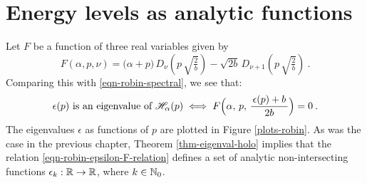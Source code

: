 \section{Energy levels as analytic functions} \label{section-robin-implicit-function}
Let $F$ be a function of three real variables given by
\begin{equation}
    F(\alpha, p, \nu) =
    \big( \alpha + p\big) \,
    D_\nu(p \, \sqrt{\tfrac{2}{b}})
    - \sqrt{2b} \,
    D_{\nu+1}(p \, \sqrt{\tfrac{2}{b}})
    \: .
\end{equation}
Comparing this with \eqref{eqn-robin-spectral}, we see that:
\begin{equation}
    \epsilon(p) \text{ is an eigenvalue of } \mathscr{H}_\alpha(p)
    \; \Longleftrightarrow \;
    F\Big(
        \alpha, \,
        p, \,
        \frac{\, \epsilon(p) + b \,}{2b}
    \Big) = 0 \: .
    \label{eqn-robin-epsilon-F-relation}
\end{equation}
The eigenvalues $\epsilon$ as functions of $p$ are plotted in Figure \ref{plots-robin}. As was the case in the previous chapter, Theorem \ref{thm-eigenval-holo} implies that the relation \eqref{eqn-robin-epsilon-F-relation} defines a set of analytic non-intersecting functions $\epsilon_k: \mathbb{R} \to \mathbb{R}$, where $k \in \mathbb{N}_0$.

